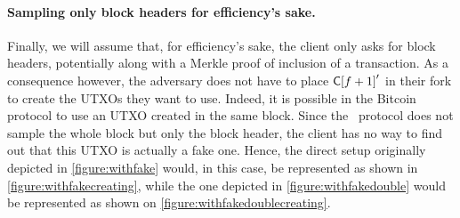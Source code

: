     \paragraph{Sampling only block headers for efficiency's sake.} Finally, we will assume that, for efficiency's sake, the client only asks for block headers, potentially along with a Merkle proof of inclusion of a transaction. As a consequence however, the adversary does not have to place \(\mathsf{C[}f+1\mathsf{]}'\) in their fork to create the UTXOs they want to use. Indeed, it is possible in the Bitcoin protocol to use an UTXO created in the same block. Since the \FC\ protocol does not sample the whole block but only the block header, the client has no way to find out that this UTXO is actually a fake one. Hence, the direct setup originally depicted in \autoref{figure:withfake} would, in this case, be represented as shown in \autoref{figure:withfakecreating}, while the one depicted in \autoref{figure:withfakedouble} would be represented as shown on \autoref{figure:withfakedoublecreating}.
    
